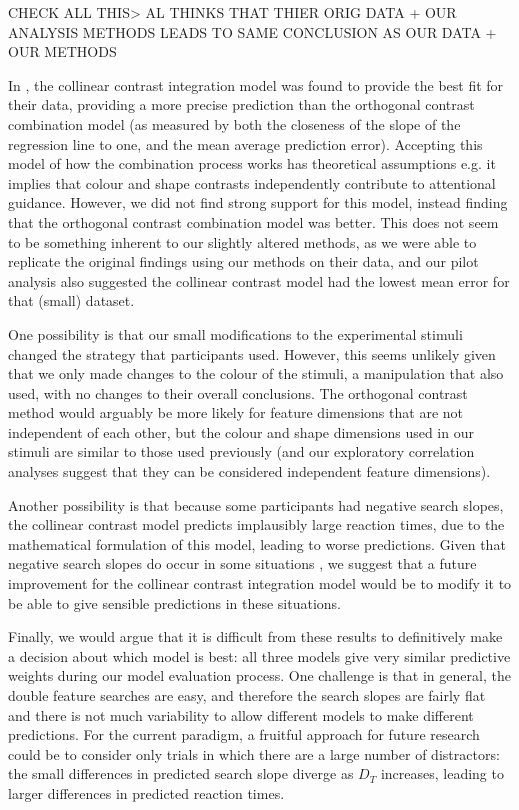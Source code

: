 \documentclass[preprint,12pt,authoryear]{elsarticle}
\begin{document}
CHECK ALL THIS> AL THINKS  THAT THIER ORIG DATA + OUR ANALYSIS METHODS LEADS TO SAME CONCLUSION AS OUR DATA + OUR METHODS 

In \cite{buetti2019predicting}, the collinear contrast integration model was found to provide the best fit for their data, providing a more precise prediction than the orthogonal contrast combination model (as measured by both the closeness of the slope of the regression line to one, and the mean average prediction error). Accepting this model of how the combination process works has theoretical assumptions e.g. it implies that colour and shape contrasts independently contribute to attentional guidance. However, we did not find strong support for this model, instead finding that the orthogonal contrast combination model was better. This does not seem to be something inherent to our slightly altered methods, as we were able to replicate the original \cite{buetti2019predicting} findings using our methods on their data, and our pilot analysis also suggested the collinear contrast model had the lowest mean error for that (small) dataset.

One possibility is that our small modifications to the experimental stimuli changed the strategy that participants used. However, this seems unlikely given that we only made changes to the colour of the stimuli, a manipulation that \cite{buetti2019predicting} also used, with no changes to their overall conclusions. The orthogonal contrast method would arguably be more likely for feature dimensions that are not independent of each other, but the colour and shape dimensions used in our stimuli are similar to those used previously (and our exploratory correlation analyses suggest that they can be considered independent feature dimensions).

Another possibility is that because some participants had negative search slopes, the collinear contrast model predicts implausibly large reaction times, due to the mathematical formulation of this model, leading to worse predictions. Given that negative search slopes do occur in some situations \citep{utochkin2013visual}, we suggest that a future improvement for the collinear contrast integration model would be to modify it to be able to give sensible predictions in these situations.

Finally, we would argue that it is difficult from these results to definitively make a decision about which model is best: all three models give very similar predictive weights during our model evaluation process. One challenge is that in general, the double feature searches are easy, and therefore the search slopes are fairly flat and there is not much variability to allow different models to make different predictions. For the current paradigm, a fruitful approach for future research could be to consider only trials in which there are a large number of distractors: the small differences in predicted search slope diverge as $D_T$ increases, leading to larger  differences in predicted reaction times.
\end{document}

